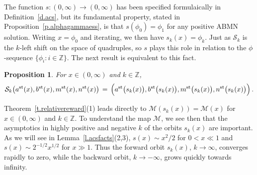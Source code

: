 \documentclass[letterpaper,11pt,oneside,reqno]{amsbook}
\newcommand{\Z}{\ensuremath{\mathbb{Z}}}
\numberwithin{figure}{chapter}
\newtheorem{proposition}[theorem]{Proposition}
\theoremstyle{definition}
\theoremstyle{definition}
\theoremstyle{definition}
\theoremstyle{definition}
\theoremstyle{definition}
\newcommand{\mc}{\mathcal}
\newcommand{\centralratio}{{\rm CenRatio}}
\newcommand{\asta}{a^{\rm st}}
\newcommand{\bst}{b^{\rm st}}
\newcommand{\mst}{m^{\rm st}}
\newcommand{\nst}{n^{\rm st}}
\newcommand{\minamm}{\mathcal{M}}
\newcommand{\abmnmacspace}{\textrm{ABMN} }
\begin{document}
 
 The function $s:(0,\infty) \to (0,\infty)$ has been specified formulaically in Definition~\ref{d.acs}, but its fundamental property, stated in Proposition~\ref{p.alphagammaess},  is that $s(\phi_0) = \phi_1$ for any positive \abmnmacspace solution. Writing $x = \phi_0$ and iterating, we then have $s_k(x) = \phi_k$. Just as $\mc{S}_k$ is the $k$-left shift on the space of quadruples, so $s$ plays this role in relation to the $\phi$-sequence $\{ \phi_i: i \in \Z \}$. The next result is equivalent to this fact.
  \begin{proposition}\label{p.shift}
  For $x \in (0,\infty)$ and $k \in \Z$, 
  \begin{equation}\label{e.shift}
    \mc{S}_k \big( \asta(x), \bst(x), \mst(x), \nst(x)  \big) \, = \,  \Big( \asta\big(s_k(x)\big), \bst \big(s_k(x)\big), \mst \big(s_k(x)\big), \nst \big(s_k(x)\big)  \Big) \, . 
 \end{equation}
  \end{proposition}  
 Theorem~\ref{t.relativereward}(1) leads directly to $\minamm(s_k(x)) = \minamm(x)$ for $x \in (0,\infty)$ and $k \in \Z$. To understand the map $\minamm$, we see then that the asymptotics in highly positive and negative $k$
 of the orbits $s_k(x)$ are important. As we will see in Lemma~\ref{l.acsfacts}(2,3), $s(x) \sim x^2/2$ for $0 < x \ll 1$ and $s(x) \sim 2^{-1/2} x^{1/2}$ for $x \gg 1$.
 Thus the forward orbit $s_k(x)$, $k \to \infty$, converges rapidly to zero, while the backward orbit, $k \to -\infty$, grows quickly towards infinity. 
 
\end{document}
